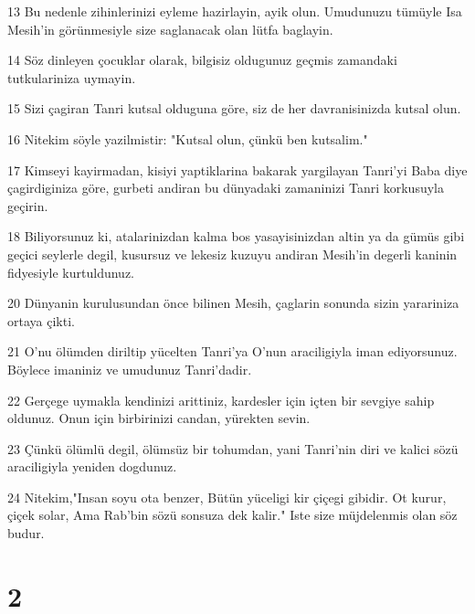 \par 13 Bu nedenle zihinlerinizi eyleme hazirlayin, ayik olun. Umudunuzu tümüyle Isa Mesih'in görünmesiyle size saglanacak olan lütfa baglayin.
\par 14 Söz dinleyen çocuklar olarak, bilgisiz oldugunuz geçmis zamandaki tutkulariniza uymayin.
\par 15 Sizi çagiran Tanri kutsal olduguna göre, siz de her davranisinizda kutsal olun.
\par 16 Nitekim söyle yazilmistir: "Kutsal olun, çünkü ben kutsalim."
\par 17 Kimseyi kayirmadan, kisiyi yaptiklarina bakarak yargilayan Tanri'yi Baba diye çagirdiginiza göre, gurbeti andiran bu dünyadaki zamaninizi Tanri korkusuyla geçirin.
\par 18 Biliyorsunuz ki, atalarinizdan kalma bos yasayisinizdan altin ya da gümüs gibi geçici seylerle degil, kusursuz ve lekesiz kuzuyu andiran Mesih'in degerli kaninin fidyesiyle kurtuldunuz.
\par 20 Dünyanin kurulusundan önce bilinen Mesih, çaglarin sonunda sizin yarariniza ortaya çikti.
\par 21 O'nu ölümden diriltip yücelten Tanri'ya O'nun araciligiyla iman ediyorsunuz. Böylece imaniniz ve umudunuz Tanri'dadir.
\par 22 Gerçege uymakla kendinizi arittiniz, kardesler için içten bir sevgiye sahip oldunuz. Onun için birbirinizi candan, yürekten sevin.
\par 23 Çünkü ölümlü degil, ölümsüz bir tohumdan, yani Tanri'nin diri ve kalici sözü araciligiyla yeniden dogdunuz.
\par 24 Nitekim,"Insan soyu ota benzer, Bütün yüceligi kir çiçegi gibidir. Ot kurur, çiçek solar, Ama Rab'bin sözü sonsuza dek kalir." Iste size müjdelenmis olan söz budur.

\chapter{2}

